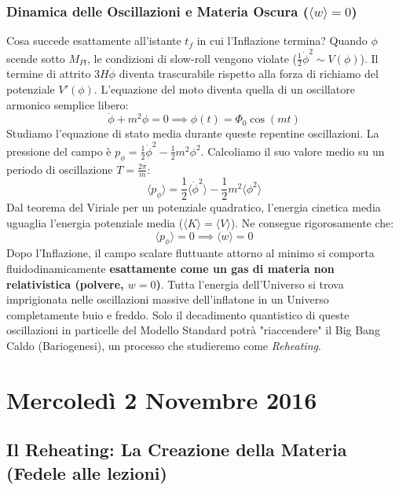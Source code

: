 \documentclass[11pt,a4paper]{report}
\begin{document}
\subsection{Dinamica delle Oscillazioni e Materia Oscura ($\langle w \rangle = 0$)}
Cosa succede esattamente all'istante $t_f$ in cui l'Inflazione termina?
Quando $\phi$ scende sotto $M_{Pl}$, le condizioni di slow-roll vengono violate ($\frac{1}{2}\dot{\phi}^2 \sim V(\phi)$). Il termine di attrito $3H\dot{\phi}$ diventa trascurabile rispetto alla forza di richiamo del potenziale $V'(\phi)$.
L'equazione del moto diventa quella di un oscillatore armonico semplice libero:
\begin{equation}
\ddot{\phi} + m^2\phi = 0 \implies \phi(t) = \Phi_0 \cos(mt)
\end{equation}
Studiamo l'equazione di stato media durante queste repentine oscillazioni.
La pressione del campo è $p_\phi = \frac{1}{2}\dot{\phi}^2 - \frac{1}{2}m^2\phi^2$. Calcoliamo il suo valore medio su un periodo di oscillazione $T = \frac{2\pi}{m}$:
\begin{equation}
\langle p_\phi \rangle = \frac{1}{2} \langle \dot{\phi}^2 \rangle - \frac{1}{2} m^2 \langle \phi^2 \rangle
\end{equation}
Dal teorema del Viriale per un potenziale quadratico, l'energia cinetica media uguaglia l'energia potenziale media ($\langle K \rangle = \langle V \rangle$). Ne consegue rigorosamente che:
\begin{equation}
\langle p_\phi \rangle = 0 \implies \langle w \rangle = 0
\end{equation}
Dopo l'Inflazione, il campo scalare fluttuante attorno al minimo si comporta fluidodinamicamente \textbf{esattamente come un gas di materia non relativistica (polvere, $w=0$)}. Tutta l'energia dell'Universo si trova imprigionata nelle oscillazioni massive dell'inflatone in un Universo completamente buio e freddo. Solo il decadimento quantistico di queste oscillazioni in particelle del Modello Standard potrà "riaccendere" il Big Bang Caldo (Bariogenesi), un processo che studieremo come \textit{Reheating}.

\chapter{Mercoledì 2 Novembre 2016}

\section{Il Reheating: La Creazione della Materia (Fedele alle lezioni)}
\end{document}
